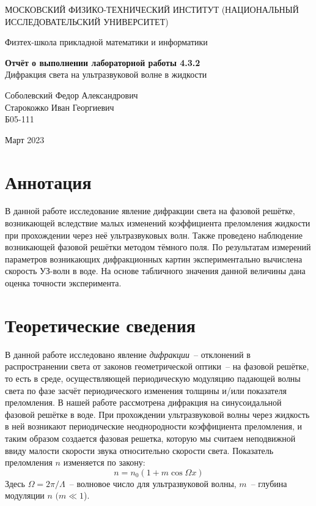 \documentclass[a4paper,12pt]{article} %
\date{\today}
\begin{document}
\begin{titlepage}
	\begin{center}
		{\large МОСКОВСКИЙ ФИЗИКО-ТЕХНИЧЕСКИЙ ИНСТИТУТ (НАЦИОНАЛЬНЫЙ ИССЛЕДОВАТЕЛЬСКИЙ УНИВЕРСИТЕТ)}
	\end{center}
	\begin{center}
		{\large Физтех-школа прикладной математики и информатики}
	\end{center}
	
	
	\vspace{4.5cm}
	{\huge
		\begin{center}
			{\bf Отчёт о выполнении лабораторной работы 4.3.2}\\
			Дифракция света на ультразвуковой волне в жидкости
		\end{center}
	}
	\vspace{1cm}
	\begin{center}
		{\large Соболевский Федор Александрович \\
                    Старокожко Иван Георгиевич \\
			\vspace{0.2cm}
			Б05-111}
	\end{center}
	\vspace{8cm}
	\begin{center}
		Март 2023
	\end{center}
\end{titlepage}

\section{Аннотация}
В данной работе исследование явление дифракции света на фазовой решётке, возникающей вследствие малых изменений коэффициента преломления жидкости при прохождении через неё ультразвуковых волн. Также проведено наблюдение возникающей фазовой решётки методом тёмного поля. По результатам измерений параметров возникающих дифракционных картин экспериментально вычислена скорость УЗ-волн в воде. На основе табличного значения данной величины дана оценка точности эксперимента.

\section{Теоретические сведения} 
В данной работе исследовано явление \textit{дифракции}~-- отклонений в распространении света от законов геометрической оптики~-- на фазовой решётке, то есть в среде, осуществляющей периодическую модуляцию падающей волны света по фазе засчёт периодического изменения толщины и/или показателя преломления. В нашей работе рассмотрена дифракция на синусоидальной фазовой решётке в воде. При прохождении ультразвуковой волны через жидкость в ней возникают периодические неоднородности коэффициента преломления, и таким образом создается фазовая решетка, которую мы считаем неподвижной ввиду малости скорости звука относительно скорости света. Показатель преломления $n$ изменяется по закону:
\begin{equation*}
    n = n_0 (1 + m \cos \Omega x)
\end{equation*}
Здесь $\Omega = 2 \pi / \Lambda$~-- волновое число для ультразвуковой волны, $m$~-- глубина модуляции $ n $ $ (m \ll 1 $).
	
\end{document}
